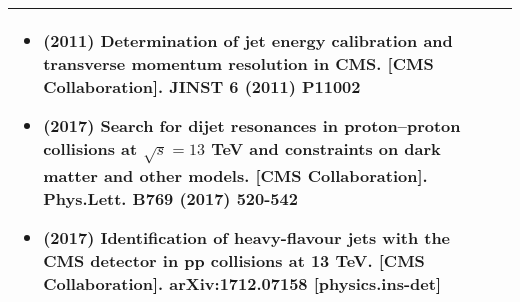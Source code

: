 \begin{center}
{\begin{tabular}{@{}p{25mm}|p{190mm}@{}}
{\begin{itemize}
\item (2011) Determination of jet energy calibration and transverse momentum resolution in CMS. [CMS Collaboration]. JINST 6 (2011) P11002
\item (2017) Search for dijet resonances in proton–proton collisions at $\sqrt{s}=13$ TeV and constraints on dark matter and other models. [CMS Collaboration]. Phys.Lett. B769 (2017) 520-542
\item (2017) Identification of heavy-flavour jets with the CMS detector in pp collisions at 13 TeV. [CMS Collaboration].  arXiv:1712.07158 [physics.ins-det]
\vspace{-4mm}
\end{itemize}
}\tabularnewline\hline
\end{tabular}
}%
\end{center}

